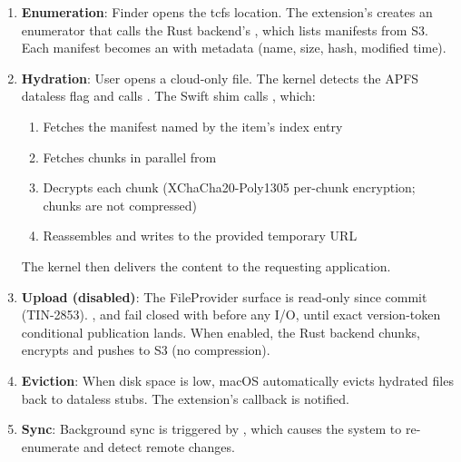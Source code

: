 \documentclass[11pt,a4paper]{article}
\begin{document}
\begin{enumerate}
  \item \textbf{Enumeration}: Finder opens the tcfs location. The extension's
         creates an enumerator that calls the Rust
        backend's , which lists manifests
        from S3. Each manifest becomes an  with
        metadata (name, size, hash, modified time).

  \item \textbf{Hydration}: User opens a cloud-only file. The kernel detects
        the APFS dataless flag and calls .
        The Swift shim calls , which:
        \begin{enumerate}[label=\alph*)]
          \item Fetches the manifest named by the item's index entry
          \item Fetches chunks in parallel from 
          \item Decrypts each chunk (XChaCha20-Poly1305 per-chunk encryption;
                chunks are not compressed)
          \item Reassembles and writes to the provided temporary URL
        \end{enumerate}
        The kernel then delivers the content to the requesting application.

  \item \textbf{Upload (disabled)}: The FileProvider surface is read-only
        since commit  (TIN-2853). ,
         and  fail closed with
         before any I/O, until
        exact version-token conditional publication lands. When enabled,
        the Rust backend chunks, encrypts and pushes to S3 (no compression).

  \item \textbf{Eviction}: When disk space is low, macOS automatically evicts
        hydrated files back to dataless stubs. The extension's
         callback is notified.

  \item \textbf{Sync}: Background sync is triggered by
        , which causes
        the system to re-enumerate and detect remote changes.
\end{enumerate}
\end{document}
